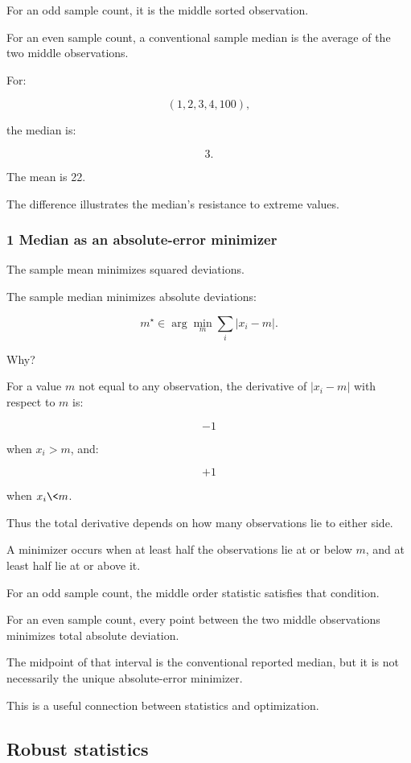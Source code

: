 For an odd sample count, it is the middle sorted observation.

For an even sample count, a conventional sample median is the average of the two middle observations.

For:

\[
 (1,2,3,4,100),
\]

the median is:

\[
 \boxed{3}.
\]

The mean is 22.

The difference illustrates the median's resistance to extreme values.

\subsubsection{1 Median as an absolute-error minimizer}\label{02-foundations-ii-ch030-median-as-an-absolute-error-minimizer}

The sample mean minimizes squared deviations.

The sample median minimizes absolute deviations:

\[
 \boxed{ m^\star\in \arg\min_m\sum_i|x_i-m| }.
\]

Why?

For a value \(m\) not equal to any observation, the derivative of \(|x_i-m|\) with respect to \(m\) is:

\[
 -1
\]

when \(x_i>m\), and:

\[
 +1
\]

when \(x_i\<m\).

Thus the total derivative depends on how many observations lie to either side.

A minimizer occurs when at least half the observations lie at or below \(m\), and at least half lie at or above it.

For an odd sample count, the middle order statistic satisfies that condition.

For an even sample count, every point between the two middle observations minimizes total absolute deviation.

The midpoint of that interval is the conventional reported median, but it is not necessarily the unique absolute-error minimizer.

This is a useful connection between statistics and optimization.

\subsection{Robust statistics}\label{02-foundations-ii-ch030-robust-statistics}

